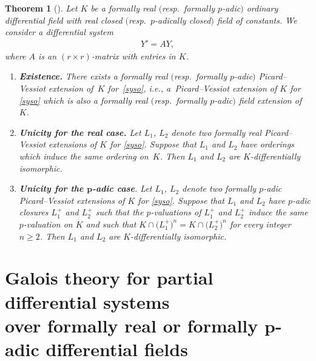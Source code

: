 \documentclass[10pt,a4paper]{amsart}
\numberwithin{equation}{section}
\newtheorem{Theorem}{Theorem}[section]
\begin{document}
\begin{Theorem}[{\cite[Theorem~2]{CHP}}] \label{CHP}
Let $K$ be a formally real $($resp.\ formally $p$-adic$)$ ordinary differential field with real closed $($resp.\ $p$-adically closed$)$ field of constants. We consider a differential system
\begin{gather}\label{syso}
Y'=A Y,
\end{gather}
where $A$ is an $(r \times r)$-matrix with entries in $K$.
\begin{enumerate}\itemsep=0pt
\item[$1.$] {\bf \emph{Existence}.} There exists a formally real $($resp.\ formally $p$-adic$)$ Picard--Vessiot extension of~$K$ for~\eqref{syso}, i.e., a~Picard--Vessiot extension of $K$ for \eqref{syso} which is also a formally real $($resp.\ formally $p$-adic$)$ field extension of~$K$.
\item[$2.$] {\bf \emph{Unicity for the real case}.} Let $L_1$, $L_2$ denote two formally real Picard--Vessiot extensions of $K$ for \eqref{syso}. Suppose that $L_1$ and $L_2$ have orderings which induce the same ordering on~$K$. Then $L_1$ and $L_2$ are $K$-differentially isomorphic.
\item[$3.$] {\bf \emph{Unicity for the} $\boldsymbol p$-\emph{adic case}}. Let $L_1$, $L_2$ denote two formally $p$-adic
Picard--Vessiot extensions of $K$ for \eqref{syso}. Suppose that $L_1$ and $L_2$
have $p$-adic closures $L_1^+$ and $L_2^+$ such that the
$p$-valuations of $L_1^+$ and $L_2^+$ induce the same
$p$-valuation
on $K$ and such that $K\cap \big(L_1^+\big)^n=K\cap \big(L_2^+\big)^n$ for every integer $n\geq 2$. Then $L_1$ and $L_2$ are $K$-differentially isomorphic.
\end{enumerate}
\end{Theorem}

\section[Galois theory for partial differential systems over formally real or formally p-adic differential fields]
{Galois theory for partial differential systems \\over formally real or formally $\boldsymbol p$-adic differential fields}
\end{document}
